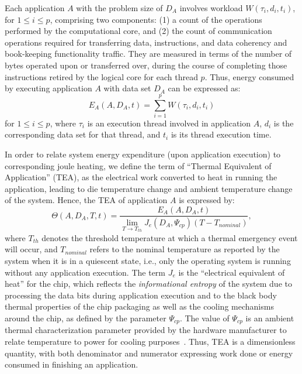 Each application $A$ with the problem size of $D_{A}$ involves workload
$W(\tau_{i},d_{i},t_{i})$, for $1 \leq i \leq p$, comprising two
components: (1) a count of the operations performed by the computational
core, and (2) the count of communication operations required for
transferring data, instructions, and data coherency and book-keeping
functionality traffic.  They are measured in terms of the number of
bytes operated upon or transferred over, during the course of completing
those instructions retired by the logical core for each thread $p$.
Thus, energy consumed by executing application $A$ with data set $D_{A}$
can be expressed as:
\begin{equation}
\label{eq:eworkload} 
E_{A}(A,D_{A},t) = \displaystyle \sum_{i=1}^{p}W(\tau_{i},d_{i},t_{i})
\end{equation}
for $1\leq i \leq p$, where $\tau_{i}$ is an execution thread involved in
application $A$, $d_{i}$ is the corresponding data set for that thread,
and $t_{i}$ is its thread execution time.

In order to relate system energy expenditure (upon application
execution) to corresponding joule heating, we define the term of
``Thermal Equivalent of Application'' (TEA), as the electrical work
converted to heat in running the application, leading to die temperature
change and ambient temperature change of the system.  Hence, the TEA of
application $A$ is expressed by:
\begin{equation}
\label{eq:tea} \Theta(A, D_{A}, T, t) =
\frac{E_{A}(A, D_{A}, t)}{\displaystyle \lim_{T \to T_{th}} J_e(D_{A}, \Psi_{cp}) (T -T_{nominal})},
\end{equation} 
where $T_{th}$ denotes the threshold temperature at which a thermal
emergency event will occur, and $T_{nominal}$ refers to the nominal
temperature as reported by the system when it is in a quiescent state,
i.e., only the operating system is running without any application
execution.  The term $J_{e}$ is the ``electrical equivalent of heat''
for the chip, which reflects the \textit{informational
  entropy} of the system due to processing the data bits
during application execution and to the black body thermal properties of
the chip packaging as well as the cooling mechanisms around the chip, as
defined by the parameter $\Psi_{cp}$.  The value of $\Psi_{cp}$ is an
ambient thermal characterization parameter provided by the hardware
manufacturer to relate temperature to power for cooling
purposes~\cite{Intel2006}.  Thus, TEA is a dimensionless quantity, with
both denominator and numerator expressing work done or energy consumed
in finishing an application.

